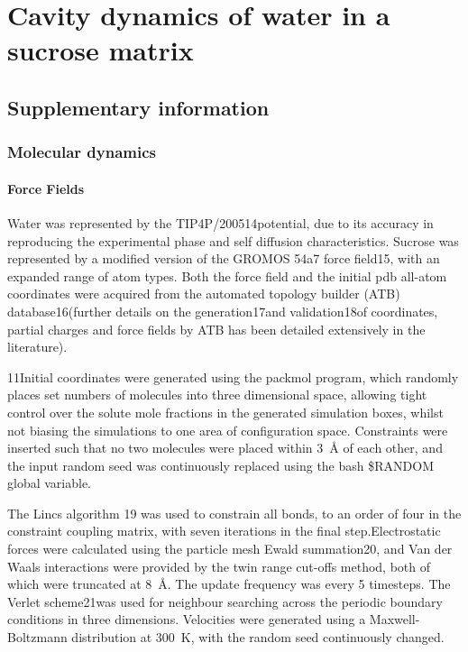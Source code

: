 %
%

\chapter{Cavity dynamics of water in a sucrose matrix}

\section{Supplementary information}
\subsection{Molecular dynamics}
\subsubsection{Force Fields}
Water was represented by the TIP4P/200514potential, due to its accuracy in reproducing the experimental phase and self diffusion characteristics. Sucrose was represented by a modified version of the GROMOS 54a7 force field15, with an expanded range of atom types. Both the force field and the initial pdb all-atom coordinates were acquired from the automated topology builder (ATB) database16(further details on the generation17and validation18of coordinates, partial charges and force fields by ATB has been detailed extensively in the literature).

11Initial coordinates were generated using the packmol program, which randomly places set numbers of molecules into three dimensional space, allowing tight control over the solute mole fractions in the generated simulation boxes, whilst not biasing the simulations to one area of configuration space. Constraints were inserted such that no two molecules were placed within \SI{3}{\angstrom} of each other, and the input random seed was continuously replaced using the bash \$RANDOM global variable. 

The Lincs algorithm 19 was used to constrain all bonds, to an order of four in the constraint coupling matrix, with seven iterations in the final step.Electrostatic forces were calculated using the particle mesh Ewald summation20, and Van der Waals interactions were provided by the twin range cut-offs method, both of which were truncated at \SI{8}{\angstrom}. The update frequency was every 5 timesteps. The Verlet scheme21was used for neighbour searching across the periodic boundary conditions in three dimensions. Velocities were generated using a Maxwell-Boltzmann distribution at \SI{300}{\kelvin}, with the random seed continuously changed.

